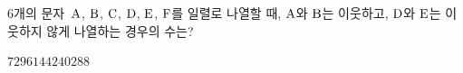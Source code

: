 \hspace*{2mm}\begin{minipage}[t]{\dimexpr\linewidth-2mm\relax}\vspace{0pt}
$6$개의 문자~$\mathrm{A}$, $\mathrm{B}$, $\mathrm{C}$, $\mathrm{D}$, $\mathrm{E}$, $\mathrm{F}$를 일렬로 나열할 때, $\mathrm{A}$와 $\mathrm{B}$는 이웃하고, $\mathrm{D}$와 $\mathrm{E}$는 이웃하지 않게 나열하는 경우의 수는?
\begin{choices32}{$72$}{$96$}{$144$}{$240$}{$288$}\end{choices32}\end{minipage}
